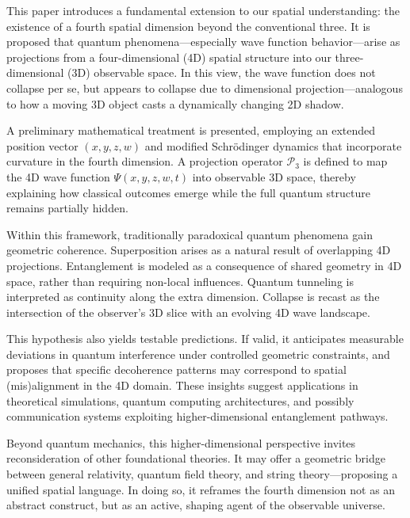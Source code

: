 \documentclass[12pt]{article}
\begin{document}
\par
This paper introduces a fundamental extension to our spatial understanding: the existence of a fourth spatial dimension beyond the conventional three. It is proposed that quantum phenomena—especially wave function behavior—arise as projections from a four-dimensional (4D) spatial structure into our three-dimensional (3D) observable space. In this view, the wave function does not collapse per se, but appears to collapse due to dimensional projection—analogous to how a moving 3D object casts a dynamically changing 2D shadow.

\par
A preliminary mathematical treatment is presented, employing an extended position vector \((x, y, z, w)\) and modified Schrödinger dynamics that incorporate curvature in the fourth dimension. A projection operator \(\mathcal{P}_3\) is defined to map the 4D wave function \(\Psi(x, y, z, w, t)\) into observable 3D space, thereby explaining how classical outcomes emerge while the full quantum structure remains partially hidden.

\par
Within this framework, traditionally paradoxical quantum phenomena gain geometric coherence. Superposition arises as a natural result of overlapping 4D projections. Entanglement is modeled as a consequence of shared geometry in 4D space, rather than requiring non-local influences. Quantum tunneling is interpreted as continuity along the extra dimension. Collapse is recast as the intersection of the observer’s 3D slice with an evolving 4D wave landscape.

\par
This hypothesis also yields testable predictions. If valid, it anticipates measurable deviations in quantum interference under controlled geometric constraints, and proposes that specific decoherence patterns may correspond to spatial (mis)alignment in the 4D domain. These insights suggest applications in theoretical simulations, quantum computing architectures, and possibly communication systems exploiting higher-dimensional entanglement pathways.

\par
Beyond quantum mechanics, this higher-dimensional perspective invites reconsideration of other foundational theories. It may offer a geometric bridge between general relativity, quantum field theory, and string theory—proposing a unified spatial language. In doing so, it reframes the fourth dimension not as an abstract construct, but as an active, shaping agent of the observable universe.
\end{document}
